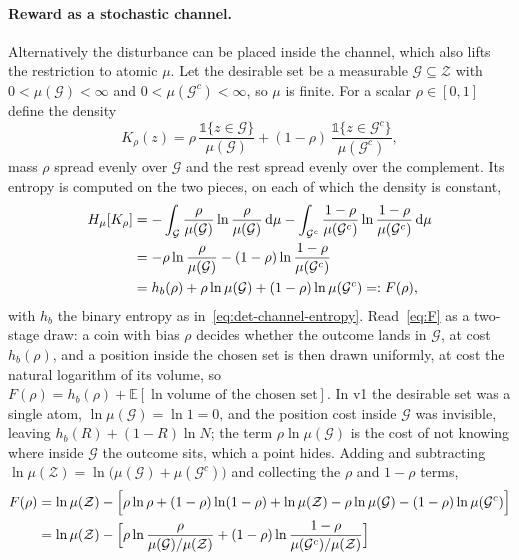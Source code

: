 \documentclass[11pt]{article}
\theoremstyle{remark}
\newcommand{\Zcal}{\mathcal Z}
\newcommand{\Gcal}{\mathcal G}
\newcommand{\E}{\mathbb E}
\newcommand{\1}{\mathds{1}}
\newcommand{\dd}{\mathrm d}
\newcommand{\Hf}[1]{H_{\mu}\!\left[#1\right]}
\newcommand{\new}[1]{\textcolor{blue!70!black}{#1}}
\begin{document}
\paragraph{Reward as a stochastic channel.}
Alternatively the disturbance can be placed inside the channel, which \new{also lifts the restriction to atomic $\mu$}.
{\color{blue!70!black}
Let the desirable set be a measurable $\Gcal\subseteq\Zcal$ with $0<\mu(\Gcal)<\infty$ and $0<\mu(\Gcal^c)<\infty$, so $\mu$ is finite.
For a scalar $\rho\in[0,1]$ define the density
\begin{equation}
  K_\rho(z)=\rho\,\frac{\1\{z\in \Gcal\}}{\mu(\Gcal)}+(1-\rho)\,\frac{\1\{z\in \Gcal^c\}}{\mu(\Gcal^c)} ,
  \label{eq:K-family}
\end{equation}
mass $\rho$ spread evenly over $\Gcal$ and the rest spread evenly over the complement.
Its entropy is computed on the two pieces, on each of which the density is constant,
\begin{align}
  \Hf{K_\rho}
  &=-\int_\Gcal\frac{\rho}{\mu(\Gcal)}\ln\frac{\rho}{\mu(\Gcal)}\,\dd\mu
    -\int_{\Gcal^c}\frac{1-\rho}{\mu(\Gcal^c)}\ln\frac{1-\rho}{\mu(\Gcal^c)}\,\dd\mu \notag\\
  &=-\rho\ln\frac{\rho}{\mu(\Gcal)}-(1-\rho)\ln\frac{1-\rho}{\mu(\Gcal^c)} \notag\\
  &=h_b(\rho)+\rho\ln\mu(\Gcal)+(1-\rho)\ln\mu(\Gcal^c)=:F(\rho),
  \label{eq:F}
\end{align}
with $h_b$ the binary entropy as in~\eqref{eq:det-channel-entropy}.
Read~\eqref{eq:F} as a two-stage draw: a coin with bias $\rho$ decides whether the outcome lands in $\Gcal$, at cost $h_b(\rho)$, and a position inside the chosen set is then drawn uniformly, at cost the natural logarithm of its volume, so $F(\rho)=h_b(\rho)+\E[\ln\text{volume of the chosen set}]$.
In v1 the desirable set was a single atom, $\ln\mu(\Gcal)=\ln1=0$, and the position cost inside $\Gcal$ was invisible, leaving $h_b(R)+(1-R)\ln N$; the term $\rho\ln\mu(\Gcal)$ is the cost of not knowing where inside $\Gcal$ the outcome sits, which a point hides.
Adding and subtracting $\ln\mu(\Zcal)=\ln\big(\mu(\Gcal)+\mu(\Gcal^c)\big)$ and collecting the $\rho$ and $1-\rho$ terms,
\begin{align}
  F(\rho)
  &=\ln\mu(\Zcal)-\Big[\rho\ln\rho+(1-\rho)\ln(1-\rho)+\ln\mu(\Zcal)-\rho\ln\mu(\Gcal)-(1-\rho)\ln\mu(\Gcal^c)\Big] \notag\\
  &=\ln\mu(\Zcal)-\Big[\rho\ln\frac{\rho}{\mu(\Gcal)/\mu(\Zcal)}+(1-\rho)\ln\frac{1-\rho}{\mu(\Gcal^c)/\mu(\Zcal)}\Big] \notag\\

\end{align}}
\end{document}
